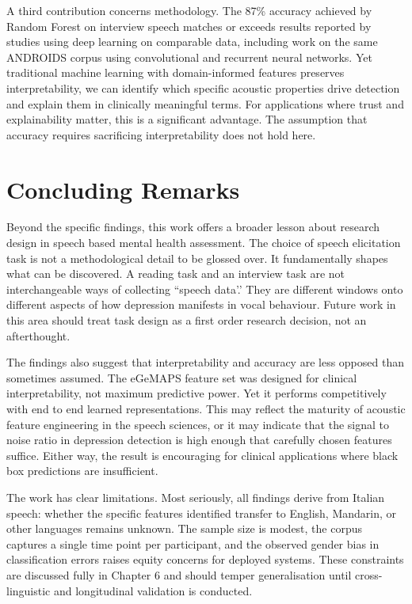 A third contribution concerns methodology. The 87\% accuracy achieved by Random Forest on interview speech matches or exceeds results reported by studies using deep learning on comparable data, including work on the same ANDROIDS corpus using convolutional and recurrent neural networks. Yet traditional machine learning with domain-informed features preserves interpretability, we can identify which specific acoustic properties drive detection and explain them in clinically meaningful terms. For applications where trust and explainability matter, this is a significant advantage. The assumption that accuracy requires sacrificing interpretability does not hold here.

\section{Concluding Remarks}

Beyond the specific findings, this work offers a broader lesson about research design in speech based mental health assessment. The choice of speech elicitation task is not a methodological detail to be glossed over. It fundamentally shapes what can be discovered. A reading task and an interview task are not interchangeable ways of collecting ``speech data'.' They are different windows onto different aspects of how depression manifests in vocal behaviour. Future work in this area should treat task design as a first order research decision, not an afterthought.

The findings also suggest that interpretability and accuracy are less opposed than sometimes assumed. The eGeMAPS feature set was designed for clinical interpretability, not maximum predictive power. Yet it performs competitively with end to end learned representations. This may reflect the maturity of acoustic feature engineering in the speech sciences, or it may indicate that the signal to noise ratio in depression detection is high enough that carefully chosen features suffice. Either way, the result is encouraging for clinical applications where black box predictions are insufficient.

The work has clear limitations. Most seriously, all findings derive from Italian speech: whether the specific features identified transfer to English, Mandarin, or other languages remains unknown. The sample size is modest, the corpus captures a single time point per participant, and the observed gender bias in classification errors raises equity concerns for deployed systems. These constraints are discussed fully in Chapter 6 and should temper generalisation until cross-linguistic and longitudinal validation is conducted.

